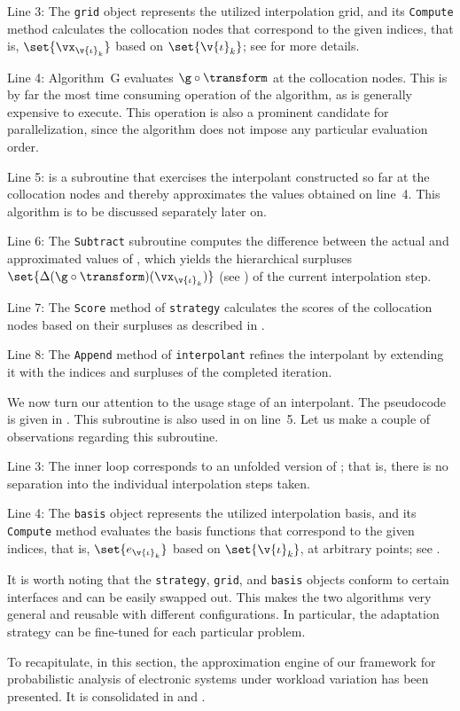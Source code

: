Line 3: The \texttt{grid} object represents the utilized interpolation grid, and
its \texttt{Compute} method calculates the collocation nodes that correspond to
the given indices, that is, $\set{\vx_{\v{\iota}_k}}$ based on
$\set{\v{\iota}_k}$; see  for more details.

Line 4: Algorithm~G evaluates $\g \circ \transform$ at the collocation nodes.
This is by far the most time consuming operation of the algorithm, as \g is
generally expensive to execute. This operation is also a prominent candidate for
parallelization, since the algorithm does not impose any particular evaluation
order.

Line 5:  is a subroutine that exercises the interpolant
constructed so far at the collocation nodes and thereby approximates the values
obtained on line~4. This algorithm is to be discussed separately later on.

Line 6: The \texttt{Subtract} subroutine computes the difference between the
actual and approximated values of \g, which yields the hierarchical surpluses
$\set{\Delta(\g \circ \transform)(\vx_{\v{\iota}_k})}$ (see
) of the current interpolation step.

Line 7: The \texttt{Score} method of \texttt{strategy} calculates the scores of
the collocation nodes based on their surpluses as described in
.

Line 8: The \texttt{Append} method of \texttt{interpolant} refines the
interpolant by extending it with the indices and surpluses of the completed
iteration.

We now turn our attention to the usage stage of an interpolant. The pseudocode
is given in . This subroutine is also used in
 on line~5. Let us make a couple of observations
regarding this subroutine.

Line 3: The inner loop corresponds to an unfolded version of
; that is, there is no separation into the individual
interpolation steps taken.

Line 4: The \texttt{basis} object represents the utilized interpolation basis,
and its \texttt{Compute} method evaluates the basis functions that correspond to
the given indices, that is, $\set{e_{\v{\iota}_k}}$ based on
$\set{\v{\iota}_k}$, at arbitrary points; see .

It is worth noting that the \texttt{strategy}, \texttt{grid}, and \texttt{basis}
objects conform to certain interfaces and can be easily swapped out. This makes
the two algorithms very general and reusable with different configurations. In
particular, the adaptation strategy can be fine-tuned for each particular
problem.

\conclusioncut
To recapitulate, in this section, the approximation engine of our framework for
probabilistic analysis of electronic systems under workload variation has been
presented. It is consolidated in  and
.
